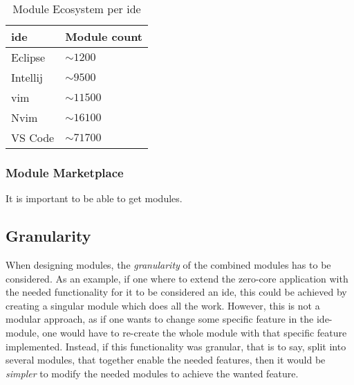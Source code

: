 
\begin{table}[]
  \centering
  \caption{Module Ecosystem per \gls{ide}}
  \label{tbl:mod}
  \begin{tabular}{|l|l|}
    \hline
    \gls{ide} & Module count \\ \hline
    Eclipse & $\sim1200$ \\ \hline
    Intellij & $\sim9500$ \\ \hline
    \gls{vim} & $\sim11500$ \\ \hline
    Nvim & $\sim16100$ \\ \hline
    VS Code & $\sim71700$ \\ \hline
  \end{tabular}
\end{table}


\subsubsection{Module Marketplace}

It is important to be able to get modules.


\subsection{Granularity}

When designing modules, the \textit{granularity} of the combined modules has to
be considered. As an example, if one where to extend the zero-core application
with the needed functionality for it to be considered an \gls{ide}, this could be
achieved by creating a singular module which does all the work. However, this
is not a modular approach, as if one wants to change some specific feature in
the \gls{ide}-module, one would have to re-create the whole module with that
specific feature implemented. Instead, if this functionality was granular,
that is to say, split into several modules, that together enable the needed
features, then it would be \textit{simpler} to modify the needed modules to
achieve the wanted feature.



